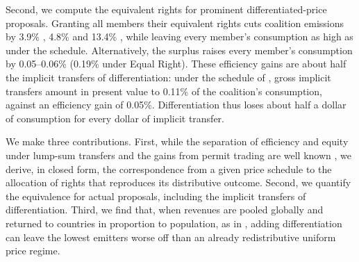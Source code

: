 \documentclass[12pt,english]{article}
\theoremstyle{remark}
\begin{document}
Second, we compute the equivalent rights for prominent differentiated-price proposals. %
Granting all members their equivalent rights cuts coalition emissions by 3.9\% \citep{banerjee_grand_2025}, 4.8\% \citep{wolfram_building_2025,parry_proposal_2021}
and 13.4\% \citep{equal_right_climate_2023}, while leaving every member's consumption as high as under the schedule. Alternatively, the surplus raises every member's consumption by 0.05--0.06\% (0.19\% under Equal Right). These efficiency gains are about half the implicit transfers of differentiation: under the schedule of \citet{banerjee_grand_2025}, gross implicit transfers amount in present value to 0.11\% of the coalition's consumption, against an efficiency gain of 0.05\%. Differentiation thus loses about half a dollar of consumption for every dollar of implicit transfer. %

We make three contributions. First, while the separation of efficiency and equity under lump-sum transfers and the gains from permit trading are well known \citep{chichilnisky_who_1994,montgomery_markets_1972,sandmo_global_2007,fleurbaey_when_2025}, %
we derive, in closed form, the correspondence from a given price schedule to the allocation of rights that reproduces its distributive outcome. %
Second, we quantify the equivalence for actual proposals, including the implicit transfers of differentiation. Third, we find that, when revenues are pooled globally and returned to countries in proportion to population, as in \citet{equal_right_climate_2023}, 
adding differentiation can leave the lowest emitters worse off than an already redistributive uniform price regime.
\end{document}
